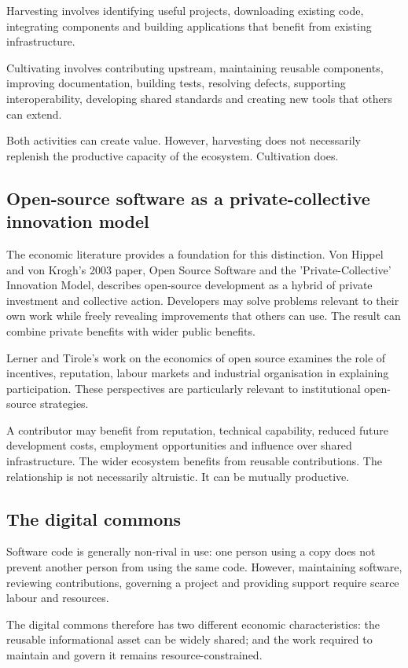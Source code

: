 \documentclass[11pt,a4paper]{article}
\begin{document}
Harvesting involves identifying useful projects, downloading existing code, integrating components and building applications that benefit from existing infrastructure.

Cultivating involves contributing upstream, maintaining reusable components, improving documentation, building tests, resolving defects, supporting interoperability, developing shared standards and creating new tools that others can extend.

Both activities can create value. However, harvesting does not necessarily replenish the productive capacity of the ecosystem. Cultivation does.

\subsection{Open-source software as a private-collective innovation model}
The economic literature provides a foundation for this distinction. Von Hippel and von Krogh's 2003 paper, Open Source Software and the 'Private-Collective' Innovation Model, describes open-source development as a hybrid of private investment and collective action. Developers may solve problems relevant to their own work while freely revealing improvements that others can use. The result can combine private benefits with wider public benefits.

Lerner and Tirole's work on the economics of open source examines the role of incentives, reputation, labour markets and industrial organisation in explaining participation. These perspectives are particularly relevant to institutional open-source strategies.

A contributor may benefit from reputation, technical capability, reduced future development costs, employment opportunities and influence over shared infrastructure. The wider ecosystem benefits from reusable contributions. The relationship is not necessarily altruistic. It can be mutually productive.

\subsection{The digital commons}
Software code is generally non-rival in use: one person using a copy does not prevent another person from using the same code. However, maintaining software, reviewing contributions, governing a project and providing support require scarce labour and resources.

The digital commons therefore has two different economic characteristics: the reusable informational asset can be widely shared; and the work required to maintain and govern it remains resource-constrained.
\end{document}
